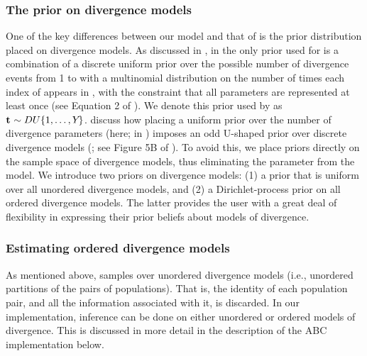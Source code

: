 \documentclass[letterpaper,12pt]{article}
\begin{document}
\begin{linenumbers}
\subsubsection*{The prior on divergence models}
One of the key differences between our model and that of \msb \citep{Huang2011}
is the prior distribution placed on divergence models.
As discussed in \citet{Oaks2012}, in \msb the only prior used for
\divTimeIndexVector is a combination of a discrete uniform prior over the
possible number of divergence events \divTimeNum from 1 to \npairs{} with a
multinomial distribution on the number of times each index of \divTimeVector
appears in \divTimeIndexVector, with the constraint that all \divTime
parameters are represented at least once (see Equation 2 of \citet{Oaks2012}).
We denote this prior used by \msb as $\mathbf{t_{}} \sim DU\{1, \ldots, Y_{}\}$.
\citet{Oaks2012} discuss how placing a uniform prior over the number of
divergence parameters (\divTimeNum here; \numt{} in \citet{Huang2011}) imposes
an odd U-shaped prior over discrete divergence models (\divTimeIndexVector; see
Figure 5B of \citet{Oaks2012}).
To avoid this, we place priors directly on the sample space of divergence
models, thus eliminating the parameter \numt{} from the model.
We introduce two priors on divergence models:
(1) a prior that is uniform over all unordered divergence models, and
(2) a Dirichlet-process prior on all ordered divergence models.
The latter provides the user with a great deal of flexibility in
expressing their prior beliefs about models of divergence.

\subsubsection*{Estimating ordered divergence models}
As mentioned above, \msb samples over unordered divergence models
(i.e., unordered partitions of the \npairs{} pairs of populations).
That is, the identity of each population pair, and all the information
associated with it, is discarded.
In our implementation, inference can be done on either unordered or ordered
models of divergence.
This is discussed in more detail in the description of the ABC implementation
below.


\end{linenumbers}
\end{document}
